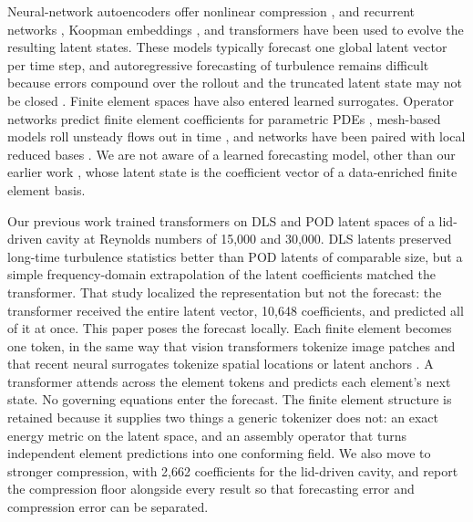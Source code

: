 \documentclass[conf]{new-aiaa}
\begin{document}
Neural-network autoencoders offer nonlinear compression \cite{gonzalez2018deep,lee2020cae,eivazi2022betavae}, and recurrent networks \cite{srinivasan2019,eivazi2021koopman,borrelli2022channels,vlachas2020backprop}, Koopman embeddings \cite{lusch2018koopman}, and transformers \cite{vaswani2017attention,wu2022transformer,solera2024betavae,geneva2022transformers,hemmasian2023transformers,sarma2024tbl} have been used to evolve the resulting latent states. These models typically forecast one global latent vector per time step, and autoregressive forecasting of turbulence remains difficult because errors compound over the rollout and the truncated latent state may not be closed \cite{linot2023stabilized,kohl2023acdm,lippe2023pderefiner}. Finite element spaces have also entered learned surrogates. Operator networks predict finite element coefficients for parametric PDEs \cite{lee2025feonet,chawla2026dgfeonet,franco2023minn}, mesh-based models roll unsteady flows out in time \cite{gao2024hypergraph,lu2026graphrom}, and networks have been paired with local reduced bases \cite{wang2019gmsfem,pan2024ddpdcnn}. We are not aware of a learned forecasting model, other than our earlier work \cite{morton2026scitech}, whose latent state is the coefficient vector of a data-enriched finite element basis.

Our previous work \cite{morton2026scitech} trained transformers on DLS and POD latent spaces of a lid-driven cavity at Reynolds numbers of 15,000 and 30,000. DLS latents preserved long-time turbulence statistics better than POD latents of comparable size, but a simple frequency-domain extrapolation of the latent coefficients matched the transformer. That study localized the representation but not the forecast: the transformer received the entire latent vector, 10,648 coefficients, and predicted all of it at once. This paper poses the forecast locally. Each finite element becomes one token, in the same way that vision transformers tokenize image patches \cite{dosovitskiy2021vit} and that recent neural surrogates tokenize spatial locations or latent anchors \cite{serrano2024aroma,alkin2024upt}. A transformer attends across the element tokens and predicts each element's next state. No governing equations enter the forecast. The finite element structure is retained because it supplies two things a generic tokenizer does not: an exact energy metric on the latent space, and an assembly operator that turns independent element predictions into one conforming field. We also move to stronger compression, with 2,662 coefficients for the lid-driven cavity, and report the compression floor alongside every result so that forecasting error and compression error can be separated.
\end{document}
